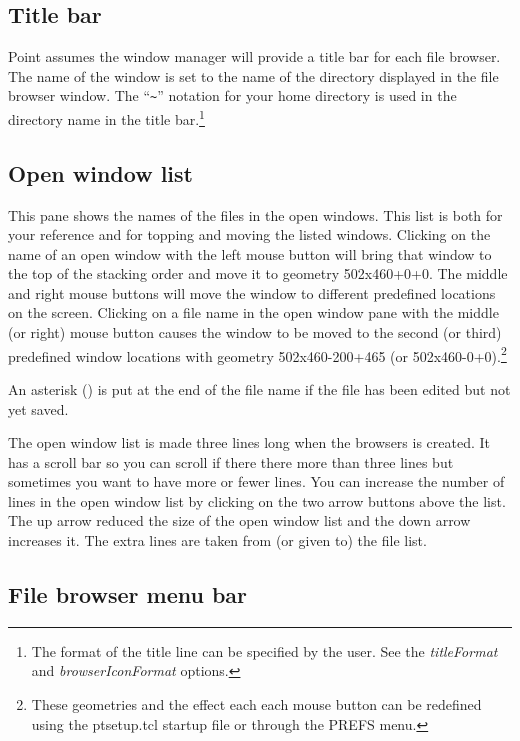 \subsection{Title bar}

Point assumes the window manager will provide a title bar for
each file browser.
The name of the window is set to the name of the directory
displayed in the file browser window.
The ``\verb+~+'' notation for your home directory is used in
the directory name in the title bar.\footnote{
	The format of the title line can be specified by the user.
	See the {\it titleFormat} and {\it browserIconFormat} options.}



\subsection{Open window list}

This pane shows the names of the files in the open windows.
This list is both for your reference and for topping and moving the
listed windows.
Clicking on the name of an open window with the left mouse button
will bring that window to the top of the stacking order
and move it to geometry 502x460+0+0.
The middle and right mouse buttons will move the window to different
predefined locations on the screen.
Clicking on a file name in the open window pane with the middle
(or right) mouse button causes the window to be moved to the second (or third)
predefined window locations with geometry 502x460-200+465
(or 502x460-0+0).\footnote{These geometries and the effect each each
mouse button can be redefined using the ptsetup.tcl startup file
or through the PREFS menu.}

An asterisk ({\tt *}) is put at the end of the file name
if the file has been edited but not yet saved.

The open window list is made three lines long when the browsers is created.
It has a scroll bar so you can scroll if there there more than three
lines but sometimes you want to have more or fewer lines.
You can increase the number of lines in the open window list by
clicking on the two arrow buttons above the list.
The up arrow reduced the size of the open window list and the down
arrow increases it.
The extra lines are taken from (or given to) the file list.



\subsection{File browser menu bar}

